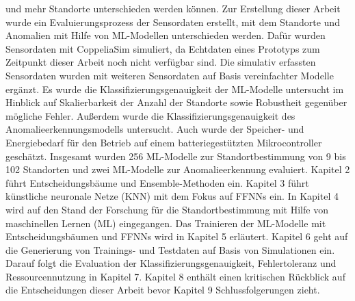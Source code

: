 und mehr Standorte unterschieden werden können.
\newline
\newline
Zur Erstellung dieser Arbeit wurde ein Evaluierungsprozess der Sensordaten erstellt, mit dem Standorte und Anomalien mit Hilfe von ML-Modellen unterschieden werden.
Dafür wurden Sensordaten mit CoppeliaSim simuliert, da Echtdaten eines Prototyps zum Zeitpunkt dieser Arbeit noch nicht verfügbar sind.
Die simulativ erfassten Sensordaten wurden mit weiteren Sensordaten auf Basis vereinfachter Modelle ergänzt.
Es wurde die Klassifizierungsgenauigkeit der ML-Modelle untersucht im Hinblick auf Skalierbarkeit der Anzahl der Standorte sowie Robustheit gegenüber mögliche Fehler.
Außerdem wurde die Klassifizierungsgenauigkeit des Anomalieerkennungsmodells untersucht.
Auch wurde der Speicher- und Energiebedarf für den Betrieb auf einem batteriegestützten Mikrocontroller geschätzt.
Insgesamt wurden 256 ML-Modelle zur Standortbestimmung von 9 bis 102 Standorten und zwei ML-Modelle zur Anomalieerkennung evaluiert.
\newline
\newline
Kapitel 2 führt Entscheidungsbäume und Ensemble-Methoden ein.
Kapitel 3 führt künstliche neuronale Netze (KNN) mit dem Fokus auf FFNNs ein.
In Kapitel 4 wird auf den Stand der Forschung für die Standortbestimmung mit Hilfe von maschinellen Lernen (ML) eingegangen.
Das Trainieren der ML-Modelle mit Entscheidungsbäumen und FFNNs wird in Kapitel 5 erläutert.
Kapitel 6 geht auf die Generierung von Trainings- und Testdaten auf Basis von Simulationen ein.
Darauf folgt die Evaluation der Klassifizierungsgenauigkeit, Fehlertoleranz und Ressourcennutzung in Kapitel 7.
Kapitel 8 enthält einen kritischen Rückblick auf die Entscheidungen dieser Arbeit bevor Kapitel 9 Schlussfolgerungen zieht.
